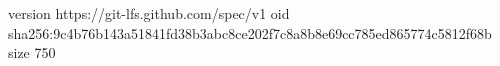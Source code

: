 version https://git-lfs.github.com/spec/v1
oid sha256:9c4b76b143a51841fd38b3abc8ce202f7c8a8b8e69cc785ed865774c5812f68b
size 750

